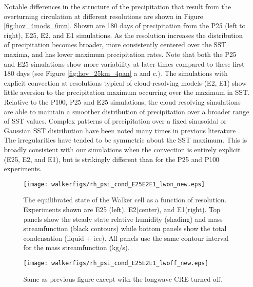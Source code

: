 \documentclass[draft]{agujournal2019}
\begin{document}
{Notable differences in the structure of the precipitation that result from the overturning circulation at different resolutions are shown in Figure \ref{fig:hov_4mods_6mn}.  
Shown are 180 days of precipitation from the P25 (left to right), E25, E2, and E1 simulations.  
As the resolution increases the distribution of precipitation becomes broader, more consistently centered over the SST maxima, and has 
lower maximum precipitation rates.  
Note that both the P25 and E25 simulations show more variability at later times compared to these 
first 180 days (see Figure \ref{fig:hov_25km_4pan} a and c.).  
The simulations with explicit convection at resolutions typical of cloud-resolving models 
(E2, E1) show little aversion to the precipitation maximum occurring over the maximum in SST.
Relative to the P100, P25 and E25 simulations, the cloud resolving simulations are able to maintain a smoother distribution of 
precipitation over a broader range of SST values.  Complex patterns of precipitation over a fixed sinusoidal or Gaussian SST distribution 
have been noted many times in previous literature \cite{Grabowski2000,Bretherton_etal_2006, Wofsy_Kuang_2012,Jeevanjee_etal_2017}. 
The irregularities have tended to be symmetric about the SST maximum.  This is broadly consistent 
with our simulations when the convection is entirely explicit (E25, E2, and E1), but is strikingly different than for the P25 and P100 experiments. 

\begin{figure}
  \centering
      \texttt{[image: walkerfigs/rh\_psi\_cond\_E25E2E1\_lwon\_new.eps]}
      \caption{The equilibrated state of the Walker cell as a function of resolution.  
      Experiments shown are E25 (left), E2(center), and E1(right). Top panels show the 
      steady state relative humidity (shading) and mass streamfunction (black contours)
      while bottom panels show the total condensation (liquid + ice).  
      All panels use the same contour interval for the 
      mass streamfunction (kg/s).}
  \label{fig:rh_psi_P25E2E1}
\end{figure}


\begin{figure}
  \centering
      \texttt{[image: walkerfigs/rh\_psi\_cond\_E25E2E1\_lwoff\_new.eps]}
          \caption{Same as previous figure except with the longwave CRE turned off.}
  \label{fig:rh_psi_P25E2E1_lwoff}
\end{figure}


}
\end{document}
